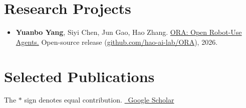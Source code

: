 \documentclass[letterpaper,11pt]{article}
\begin{document}
\section{Research Projects}
\begin{itemize}[leftmargin=0.15in]
  \item \textbf{Yuanbo Yang}, Siyi Chen, Jun Gao, Hao Zhang.
  \href{https://haoailab.com/blogs/ora/}{ORA: Open Robot-Use Agents.}
  Open-source release (\href{https://github.com/hao-ai-lab/ORA}{github.com/hao-ai-lab/ORA}), 2026.
\end{itemize}

\section{Selected Publications}
\small The $*$ sign denotes equal contribution. \href{https://scholar.google.com/citations?user=aVOAL6cAAAAJ}{\faGoogle\ Google Scholar}
\end{document}
